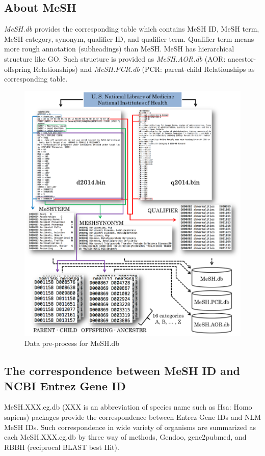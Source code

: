 \documentclass[11pt]{article}
\newcommand{\Rpackage}[1]{{\textit{#1}}}
\begin{document}
\subsection{About MeSH}
\Rpackage{MeSH.db} provides the corresponding table which contains MeSH ID, MeSH term, MeSH category, synonym, qualifier ID, and qualifier term. Qualifier term means more rough annotation (subheadings) than MeSH. MeSH has hierarchical structure like GO. Such structure is provided as \Rpackage{MeSH.AOR.db} (AOR: ancestor-offspring Relationships) and \Rpackage{MeSH.PCR.db} (PCR: parent-child Relationships as corresponding table.
\begin{figure}[ht]
\centering
\includegraphics[width=14.0cm]{fig2.png}
\caption{Data pre-process for MeSH.db}
\label{fig2}
\end{figure}
\clearpage
\subsection{The correspondence between MeSH ID and NCBI Entrez Gene ID}
MeSH.XXX.eg.db (XXX is an abbreviation of species name such as Hsa: Homo sapiens) packages provide the correspondence between Entrez Gene IDs and NLM MeSH IDs. Such correspondence in wide variety of organisms are summarized as each MeSH.XXX.eg.db by three way of methods, Gendoo\cite{Nakazato2009}, gene2pubmed, and RBBH (reciprocal BLAST best Hit).
\end{document}
